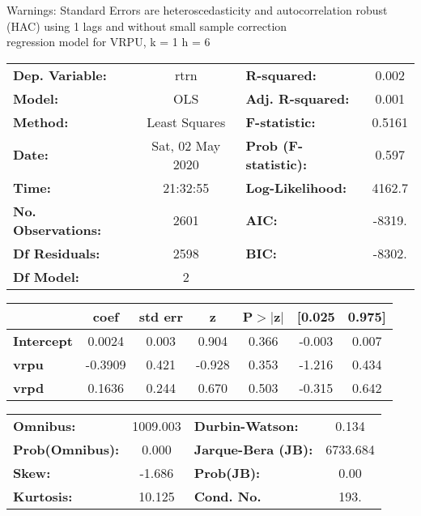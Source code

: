 Warnings: \newline
 [1] Standard Errors are heteroscedasticity and autocorrelation robust (HAC) using 1 lags and without small sample correction\\ 

regression model for VRPU, k = 1 h = 6\begin{center}
\begin{tabular}{lclc}
\toprule
\textbf{Dep. Variable:}    &       rtrn       & \textbf{  R-squared:         } &     0.002   \\
\textbf{Model:}            &       OLS        & \textbf{  Adj. R-squared:    } &     0.001   \\
\textbf{Method:}           &  Least Squares   & \textbf{  F-statistic:       } &    0.5161   \\
\textbf{Date:}             & Sat, 02 May 2020 & \textbf{  Prob (F-statistic):} &    0.597    \\
\textbf{Time:}             &     21:32:55     & \textbf{  Log-Likelihood:    } &    4162.7   \\
\textbf{No. Observations:} &        2601      & \textbf{  AIC:               } &    -8319.   \\
\textbf{Df Residuals:}     &        2598      & \textbf{  BIC:               } &    -8302.   \\
\textbf{Df Model:}         &           2      & \textbf{                     } &             \\
\bottomrule
\end{tabular}
\begin{tabular}{lcccccc}
                   & \textbf{coef} & \textbf{std err} & \textbf{z} & \textbf{P$> |$z$|$} & \textbf{[0.025} & \textbf{0.975]}  \\
\midrule
\textbf{Intercept} &       0.0024  &        0.003     &     0.904  &         0.366        &       -0.003    &        0.007     \\
\textbf{vrpu}      &      -0.3909  &        0.421     &    -0.928  &         0.353        &       -1.216    &        0.434     \\
\textbf{vrpd}      &       0.1636  &        0.244     &     0.670  &         0.503        &       -0.315    &        0.642     \\
\bottomrule
\end{tabular}
\begin{tabular}{lclc}
\textbf{Omnibus:}       & 1009.003 & \textbf{  Durbin-Watson:     } &    0.134  \\
\textbf{Prob(Omnibus):} &   0.000  & \textbf{  Jarque-Bera (JB):  } & 6733.684  \\
\textbf{Skew:}          &  -1.686  & \textbf{  Prob(JB):          } &     0.00  \\
\textbf{Kurtosis:}      &  10.125  & \textbf{  Cond. No.          } &     193.  \\
\bottomrule
\end{tabular}
\end{center}

